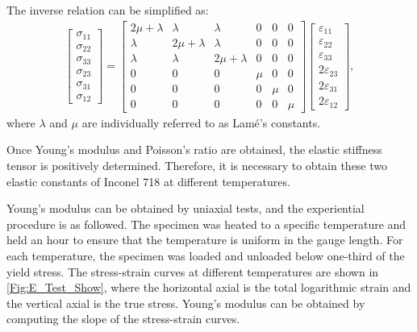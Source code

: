 The inverse relation can be simplified as:
\begin{eqnarray}
   \begin{bmatrix}\sigma_{11} \\ \sigma_{22} \\ \sigma_{33} \\ \sigma_{23} \\ \sigma_{31} \\ \sigma_{12} \end{bmatrix}
   =
   \begin{bmatrix} 2\mu+\lambda & \lambda & \lambda & 0 & 0 & 0 \\
                   \lambda & 2\mu+\lambda & \lambda & 0 & 0 & 0 \\
                   \lambda & \lambda & 2\mu+\lambda & 0 & 0 & 0 \\
                   0 & 0 & 0 & \mu & 0 & 0 \\
                   0 & 0 & 0 & 0 & \mu & 0 \\
                   0 & 0 & 0 & 0 & 0 & \mu \end{bmatrix}
    \begin{bmatrix}\varepsilon_{11} \\ \varepsilon_{22} \\ \varepsilon_{33} \\ 2\varepsilon_{23} \\ 2\varepsilon_{31} \\ 2\varepsilon_{12} \end{bmatrix},
\end{eqnarray}
where $\lambda$ and $\mu$ are individually referred to as Lam\'{e}'s constants.

Once Young's modulus and Poisson's ratio are obtained, the elastic stiffness tensor is positively determined.
Therefore, it is necessary to obtain these two elastic constants of Inconel 718 at different temperatures.

Young's modulus can be obtained by uniaxial tests, and the experiential procedure is as followed.
The specimen was heated to a specific temperature and held an hour to ensure that the temperature is uniform in the gauge length.
For each temperature, the specimen was loaded and unloaded below one-third of the yield stress.
The stress-strain curves at different temperatures are shown in \ref{Fig:E_Test_Show}, where the horizontal axial is the total logarithmic strain and the vertical axial is the true stress.
Young's modulus can be obtained by computing the slope of the stress-strain curves.
 
